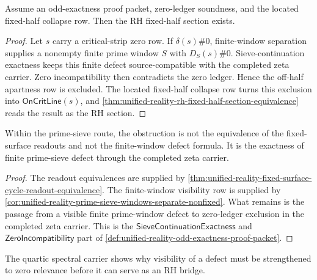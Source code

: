 \begin{theorem}
\label{thm:unified-reality-odd-exactness-packet-closes-rh-section}
Assume an odd-exactness proof packet, zero-ledger soundness, and the
located fixed-half collapse row.  Then the RH fixed-half section exists.
\end{theorem}

\begin{proof}
Let $s$ carry a critical-strip zero row.  If $\delta(s)\#0$, finite-window
separation supplies a nonempty finite prime window $S$ with
$D_S(s)\#0$.  Sieve-continuation exactness keeps this finite defect
source-compatible with the completed zeta carrier.  Zero incompatibility
then contradicts the zero ledger.  Hence the off-half apartness row is
excluded.  The located fixed-half collapse row turns this exclusion into
$\mathsf{OnCritLine}(s)$, and
\autoref{thm:unified-reality-rh-fixed-half-section-equivalence} reads the
result as the RH section.
\end{proof}

\begin{corollary}
\label{cor:unified-reality-prime-sieve-obstruction-analytic-exactness}
Within the prime-sieve route, the obstruction is not the equivalence of
the fixed-surface readouts and not the finite-window defect formula.  It is
the exactness of finite prime-sieve defect through the completed zeta
carrier.
\end{corollary}

\begin{proof}
The readout equivalences are supplied by
\autoref{thm:unified-reality-fixed-surface-cycle-readout-equivalence}.
The finite-window visibility row is supplied by
\autoref{cor:unified-reality-prime-sieve-windows-separate-nonfixed}.  What
remains is the passage from a visible finite prime-window defect to
zero-ledger exclusion in the completed zeta carrier.  This is the
$\mathsf{SieveContinuationExactness}$ and $\mathsf{ZeroIncompatibility}$
part of
\autoref{def:unified-reality-odd-exactness-proof-packet}.
\end{proof}

\begin{theorem}
\label{thm:unified-reality-quartic-marks-zero-relevance-boundary}
The quartic spectral carrier shows why visibility of a defect must be
strengthened to zero relevance before it can serve as an RH bridge.
\end{theorem}

